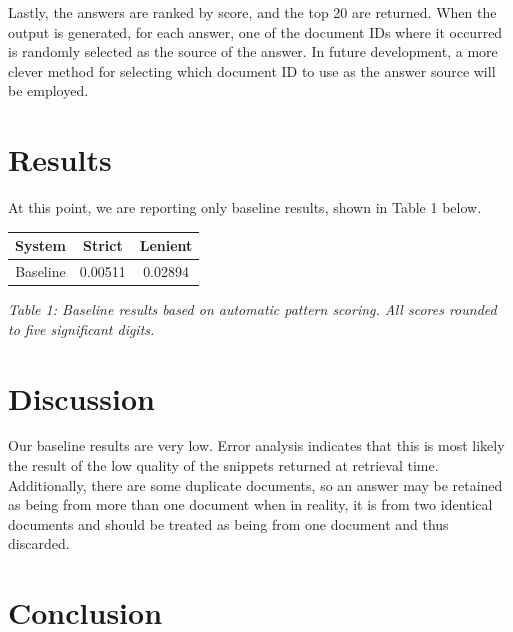\documentclass[11pt]{article}
\begin{document}
Lastly, the answers are ranked by score, and the top 20 are returned.  When the output is generated, for each answer, one of the document IDs where it occurred is randomly selected as the source of the answer.  In future development, a more clever method for selecting which document ID to use as the answer source will be employed.

\section{Results}

At this point, we are reporting only baseline results, shown in Table 1 below.

\vspace{5mm}
{\centering
\begin{tabular}{|c|c|c|}
\hline
\textbf{System} & \textbf{Strict} & \textbf{Lenient} \\ \hline
Baseline & 0.00511 & 0.02894 \\ \hline
\end{tabular}

\vspace{1mm}
\emph{Table 1: Baseline results based on automatic pattern scoring. All scores rounded to five significant digits.}
\par}

\section{Discussion}

Our baseline results are very low.  Error analysis indicates that this is most likely the result of the low quality of the snippets returned at retrieval time.  Additionally, there are some duplicate documents, so an answer may be retained as being from more than one document when in reality, it is from two identical documents and should be treated as being from one document and thus discarded.

\section{Conclusion}

\nocite{*}




\end{document}
